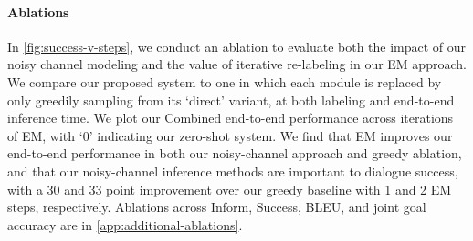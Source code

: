 \documentclass[11pt]{article}
\begin{document}

\paragraph{Ablations} In \autoref{fig:success-v-steps}, we conduct an ablation to evaluate both the impact of our noisy channel modeling and the value of iterative re-labeling in our EM approach.
We compare our proposed system to one in which each module is replaced by only greedily sampling from its `direct' variant, at both labeling and end-to-end inference time. We plot our Combined end-to-end performance across iterations of EM, with `0' indicating our zero-shot system.
We find that EM improves our end-to-end performance in both our noisy-channel approach and greedy ablation, and that our noisy-channel inference methods are important to dialogue success, with a 30 and 33 point improvement over our greedy baseline with 1 and 2 EM steps, respectively. 
Ablations across Inform, Success, BLEU, and joint goal accuracy are in \autoref{app:additional-ablations}.
\end{document}
